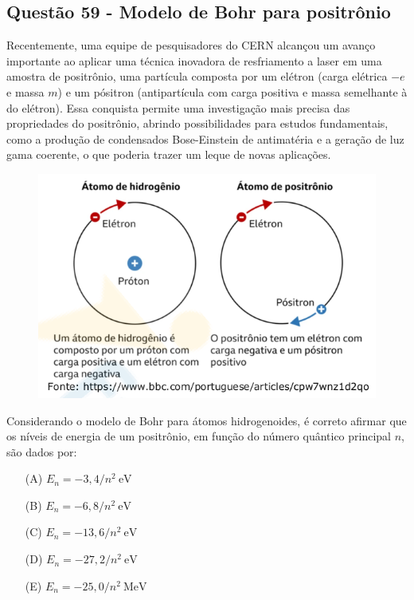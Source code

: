\documentclass[a4paper,12pt]{article}
\begin{document}
\begin{flushleft}
\subsection{Quest\~ao 59 - Modelo de Bohr para positrônio} 

Recentemente, uma equipe de pesquisadores do CERN alcançou um avanço importante ao aplicar uma técnica inovadora de resfriamento a laser 
em uma amostra de positrônio, uma partícula composta por um elétron (carga elétrica \(-e\) e massa \(m\)) e um pósitron (antipartícula com 
carga positiva e massa semelhante à do elétron). Essa conquista permite uma investigação mais
precisa das propriedades do positrônio, abrindo possibilidades para estudos fundamentais, como a
produção de condensados Bose-Einstein de antimatéria e a geração de luz gama coerente, o que
poderia trazer um leque de novas aplicações.

\begin{figure}[!h]
  \centering
  \includegraphics[scale=0.6]{figures/positronio.png}
\end{figure}

Considerando o modelo de Bohr para átomos hidrogenoides, é correto afirmar que os níveis de energia de um positrônio, em função do número 
quântico principal \(n\), são dados por:

\begin{itemize}
\item[(A)] \(E_n=-3{,}4/n^2\ \mathrm{eV}\)
\item[(B)] \(E_n=-6{,}8/n^2\ \mathrm{eV}\)
\item[(C)] \(E_n=-13{,}6/n^2\ \mathrm{eV}\)
\item[(D)] \(E_n=-27{,}2/n^2\ \mathrm{eV}\)
\item[(E)] \(E_n=-25{,}0/n^2\ \mathrm{MeV}\)
\end{itemize}


\end{flushleft}
\end{document}
